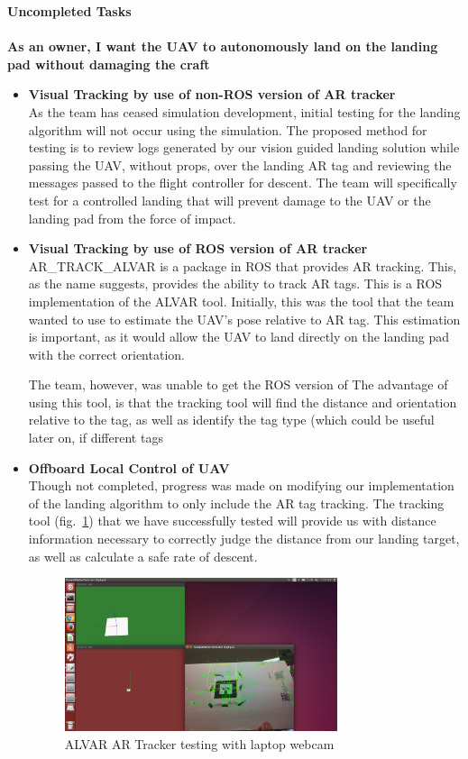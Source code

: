 \vspace{5mm}
\noindent\Large{\textbf{Uncompleted Tasks}}\\
\vspace{2mm}\\
\noindent \large{\textbf{As an owner, I want the UAV to autonomously land on the landing pad without damaging the craft}}
\normalsize
\begin{itemize}
\item \textbf{Visual Tracking by use of non-ROS version of AR tracker}\\
As the team has ceased simulation development, initial testing for the landing algorithm will not occur using the simulation. The proposed method for testing is to review logs generated by our vision guided landing solution while passing the UAV, without props, over the landing AR tag and reviewing the messages passed to the flight controller for descent. The team will specifically test for a controlled landing that will prevent damage to the UAV or the landing pad from the force of impact.
\item \textbf{Visual Tracking by use of ROS version of AR tracker}\\
AR_TRACK_ALVAR is a package in ROS that provides AR tracking. This, as the name suggests, provides the ability to track AR tags. This is a ROS implementation of the ALVAR tool. Initially, this was the tool that the team wanted to use to estimate the UAV's pose relative to AR tag. This estimation is important, as it would allow the UAV to land directly on the landing pad with the correct orientation. \par
The team, however, was unable to get the ROS version of The advantage of using this tool, is that the tracking tool will find the distance and orientation relative to the tag, as well as identify the tag type (which could be useful later on, if different tags 
\item \textbf{Offboard Local Control of UAV}\\
Though not completed, progress was made on modifying our implementation of the landing algorithm to only include the AR tag tracking. The tracking tool (fig.~\ref{fig:artracker}) that we have successfully tested will provide us with distance information necessary to correctly judge the distance from our landing target, as well as calculate a safe rate of descent.
\begin{figure}[h]
\includegraphics[width=8cm]{AlvarExample.png}
\centering
\caption{ALVAR AR Tracker testing with laptop webcam}
\label{fig:artracker}
\end{figure}

\end{itemize}


